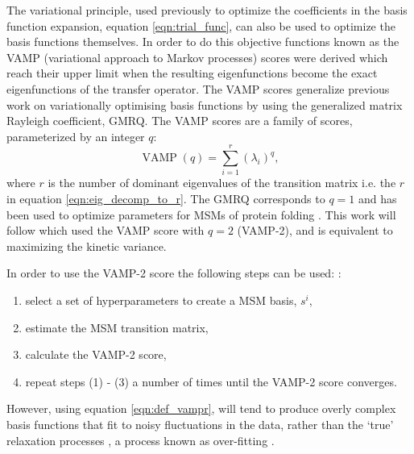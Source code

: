 The variational principle, used previously to optimize the coefficients in the basis function expansion, equation \ref{eqn:trial_func}, can also be used to optimize the basis functions themselves.  \cite{schererVariationalSelectionFeatures2019}\cite{husicOptimizedParameterSelection2016} In order to do this objective functions known as the VAMP (variational approach to Markov processes) scores \cite{wuVariationalApproachLearning2020c} were derived which reach their upper limit when the resulting eigenfunctions become the exact eigenfunctions of the transfer operator. The VAMP scores generalize previous work on variationally optimising basis functions by \cite{mcgibbonVariationalCrossvalidationSlow2015} using the generalized matrix Rayleigh coefficient, GMRQ. The VAMP scores are a family of scores, parameterized by an integer $q$: \cite{wuVariationalApproachLearning2020c}
\begin{equation}\label{eqn:def_vampr}
\operatorname{VAMP}(q)=\sum_{i=1}^{r}\left(\lambda_{i}\right)^{q}, 
\end{equation} 
where $r$ is the number of dominant eigenvalues of the transition matrix i.e. the $r$ in equation \ref{eqn:eig_decomp_to_r}. The GMRQ corresponds to $q=1$ and has been used to optimize parameters for MSMs of protein folding \cite{husicOptimizedParameterSelection2016}. This work will follow \cite{schererVariationalSelectionFeatures2019} which used the VAMP  score with $q=2$ (VAMP-2), and is equivalent to maximizing the kinetic variance. \cite{wuVariationalApproachLearning2020c}

In order to use the VAMP-2 score the following steps can be used:  \cite{schererVariationalSelectionFeatures2019}:
\begin{enumerate}
    \item select a set of hyperparameters to create a MSM basis, $s^{i}$, 
    \item estimate the MSM transition matrix, 
    \item calculate the VAMP-2 score, 
    \item repeat steps (1) - (3) a number of times until the VAMP-2 score converges. 
\end{enumerate}
However, using equation \ref{eqn:def_vampr}, will tend to produce overly complex basis functions that fit to noisy fluctuations in the data, rather than the `true' relaxation processes \cite{mcgibbonVariationalCrossvalidationSlow2015}\cite{wuVariationalApproachLearning2020c}\cite{schererVariationalSelectionFeatures2019}, a process known as over-fitting \cite{friedman2001elements}.

